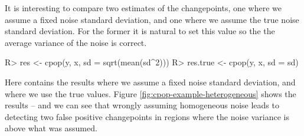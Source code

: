 \documentclass[nojss]{jss}
\begin{document}
It is interesting to compare two estimates of the changepoints, one where we assume a fixed noise standard deviation, and one where we assume the true noise standard deviation. For the former it is natural to set this value so the the average variance of the noise is correct. 
\begin{CodeChunk}
\begin{CodeInput}
R> res <- cpop(y, x, sd = sqrt(mean(sd^2)))
R> res.true <- cpop(y, x, sd = sd)
\end{CodeInput}
\end{CodeChunk}
Here  contains the results where we assume a fixed noise standard deviation, and  where we use the true values. Figure \ref{fig:cpop-example-heterogeneous} shows the results -- and we can see that wrongly assuming homogeneous noise leads to detecting two false positive changepoints in regions where the noise variance is above what was assumed. 

\end{document}

